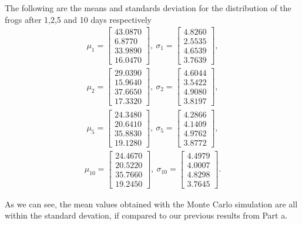 The following are the means and standards deviation for the distribution of the frogs after 1,2,5 and 10 days respectively
\begin{align*}
    \textbf{$\mu_{1}$} = \begin{bmatrix}
           43.0870 \\
           6.8770\\
           33.9890\\
           16.0470
         \end{bmatrix},\
    \textbf{$\sigma_{1}$} = \begin{bmatrix}
           4.8260\\
           2.5535\\
           4.6539\\
           3.7639
         \end{bmatrix},
\end{align*}
\begin{align*}
    \textbf{$\mu_{2}$} = \begin{bmatrix}
           29.0390 \\
           15.9640\\
           37.6650\\
           17.3320
         \end{bmatrix},\
    \textbf{$\sigma_{2}$} = \begin{bmatrix}
           4.6044\\
           3.5422\\
           4.9080\\
           3.8197
         \end{bmatrix},
\end{align*}
\begin{align*}
    \textbf{$\mu_{5}$} = \begin{bmatrix}
           24.3480 \\
           20.6410\\
           35.8830\\
           19.1280
         \end{bmatrix},\
    \textbf{$\sigma_{5}$} = \begin{bmatrix}
           4.2866\\
           4.1409\\
           4.9762\\
           3.8772
         \end{bmatrix},
\end{align*}
\begin{align*}
    \textbf{$\mu_{10}$} = \begin{bmatrix}
           24.4670 \\
           20.5220\\
           35.7660\\
           19.2450
         \end{bmatrix},\
    \textbf{$\sigma_{10}$} = \begin{bmatrix}
           4.4979\\
           4.0007\\
           4.8298\\
           3.7645
         \end{bmatrix}.
\end{align*}

As we can see, the mean values obtained with the Monte Carlo simulation are all within the standard devation, if compared to our previous results from Part a.